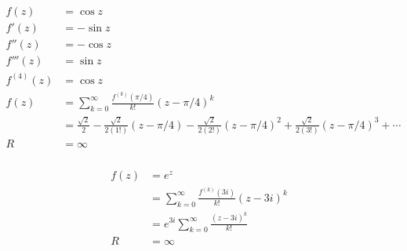 \documentclass{article}
\begin{document}
\begin{align*}
  f(z)       & = \cos z                                                                                                                                                  \\
  f'(z)      & = -\sin z                                                                                                                                                 \\
  f''(z)     & = -\cos z                                                                                                                                                 \\
  f'''(z)    & = \sin z                                                                                                                                                  \\
  f^{(4)}(z) & = \cos z                                                                                                                                                  \\
  f(z)       & = \sum_{k = 0}^\infty \frac{f^{(k)} (\pi / 4)}{k!} (z - \pi / 4)^k                                                                                        \\
             & = \frac{\sqrt{2}}{2} - \frac{\sqrt{2}}{2 (1!)} (z - \pi / 4) - \frac{\sqrt{2}}{2 (2!)} (z - \pi / 4)^2 + \frac{\sqrt{2}}{2 (3!)} (z - \pi / 4)^3 + \cdots \\
  R          & = \infty
\end{align*}

\setcounter{subsubsection}{20}
\subsubsection{}

\begin{align*}
  f(z) & = e^z                                                     \\
       & = \sum_{k = 0}^\infty \frac{f^{(k)}(3 i)}{k!} (z - 3 i)^k \\
       & = e^{3 i} \sum_{k = 0}^\infty \frac{(z - 3 i)^k}{k!}      \\
  R    & = \infty
\end{align*}

\setcounter{subsubsection}{22}
\subsubsection{}
\end{document}
